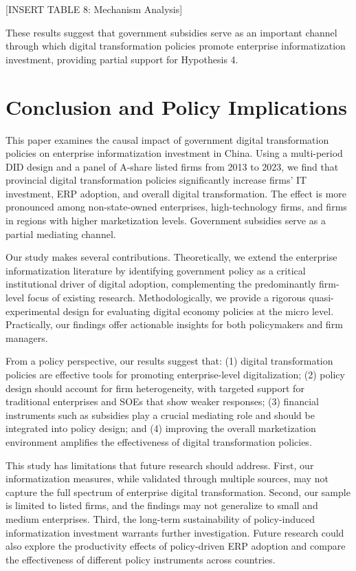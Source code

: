 \documentclass[12pt]{article}
\begin{document}
[INSERT TABLE 8: Mechanism Analysis]

These results suggest that government subsidies serve as an important channel through which digital transformation policies promote enterprise informatization investment, providing partial support for Hypothesis 4.

\section{Conclusion and Policy Implications}

This paper examines the causal impact of government digital transformation policies on enterprise informatization investment in China. Using a multi-period DID design and a panel of A-share listed firms from 2013 to 2023, we find that provincial digital transformation policies significantly increase firms' IT investment, ERP adoption, and overall digital transformation. The effect is more pronounced among non-state-owned enterprises, high-technology firms, and firms in regions with higher marketization levels. Government subsidies serve as a partial mediating channel.

Our study makes several contributions. Theoretically, we extend the enterprise informatization literature by identifying government policy as a critical institutional driver of digital adoption, complementing the predominantly firm-level focus of existing research. Methodologically, we provide a rigorous quasi-experimental design for evaluating digital economy policies at the micro level. Practically, our findings offer actionable insights for both policymakers and firm managers.

From a policy perspective, our results suggest that: (1) digital transformation policies are effective tools for promoting enterprise-level digitalization; (2) policy design should account for firm heterogeneity, with targeted support for traditional enterprises and SOEs that show weaker responses; (3) financial instruments such as subsidies play a crucial mediating role and should be integrated into policy design; and (4) improving the overall marketization environment amplifies the effectiveness of digital transformation policies.

This study has limitations that future research should address. First, our informatization measures, while validated through multiple sources, may not capture the full spectrum of enterprise digital transformation. Second, our sample is limited to listed firms, and the findings may not generalize to small and medium enterprises. Third, the long-term sustainability of policy-induced informatization investment warrants further investigation. Future research could also explore the productivity effects of policy-driven ERP adoption and compare the effectiveness of different policy instruments across countries.
\end{document}
